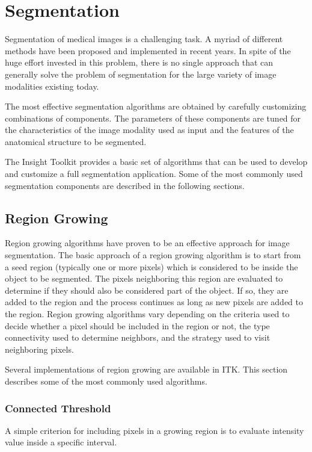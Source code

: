 
\chapter{Segmentation}

Segmentation of medical images is a challenging task. A myriad of different
methods have been proposed and implemented in recent years. In spite of the
huge effort invested in this problem, there is no single approach that can
generally solve the problem of segmentation for the large variety of image
modalities existing today.

The most effective segmentation algorithms are obtained by carefully
customizing combinations of components. The parameters of these components are
tuned for the characteristics of the image modality used as input and the
features of the anatomical structure to be segmented.

The Insight Toolkit provides a basic set of algorithms that can be used to
develop and customize a full segmentation application. Some of the most
commonly used segmentation components are described in the following
sections.


\section{Region Growing}

Region growing algorithms have proven to be an effective approach for image
segmentation. The basic approach of a region growing algorithm is to start
from a seed region (typically one or more pixels) which is considered to be
inside the object to be segmented. The pixels neighboring this region are
evaluated to determine if they should also be considered part of the
object. If so, they are added to the region and the process continues as long
as new pixels are added to the region.  Region growing algorithms vary
depending on the criteria used to decide whether a pixel should be included
in the region or not, the type connectivity used to determine neighbors, and
the strategy used to visit neighboring pixels.

Several implementations of region growing are available in ITK.  This section
describes some of the most commonly used algorithms.

\subsection{Connected Threshold}

A simple criterion for including pixels in a growing region is to evaluate
intensity value inside a specific interval.

